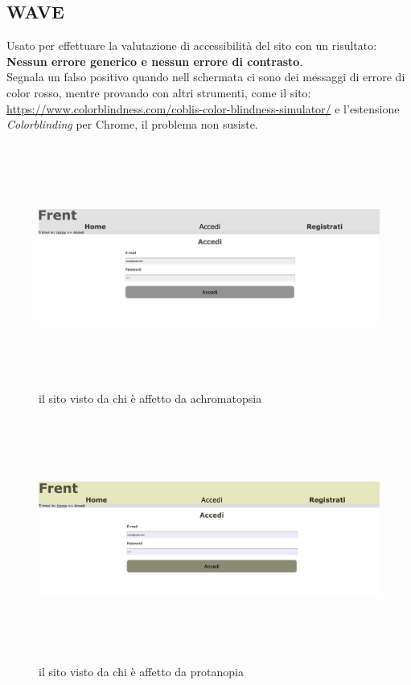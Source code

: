\documentclass[1_relazione.tex]{subfiles}
\begin{document}
    \subsection{WAVE}
    Usato per effettuare la valutazione di accessibilit\`{a} del sito con un risultato: \textbf{Nessun errore generico e nessun errore di contrasto}.
    \\Segnala un falso positivo quando nell schermata ci sono dei messaggi di errore di color rosso, mentre provando con altri strumenti, come il sito:\\ \url{https://www.colorblindness.com/coblis-color-blindness-simulator/}
    e l'estensione \textit{Colorblinding} per Chrome, il problema non susiste.
    \begin{figure}[h!]
        \centering
        \includegraphics[width=13cm, height=8cm]{immagini/Achromatopsia.png}
        \caption{il sito visto da chi \`{e} affetto da achromatopsia}
    \end{figure}
    \begin{figure}[h!]
        \centering
        \includegraphics[width=13cm, height=8cm]{immagini/Protanopia.png}
        \caption{il sito visto da chi \`{e} affetto da protanopia}
    \end{figure}
\end{document}
